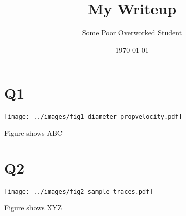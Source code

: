 \documentclass[12pt]{article}
\title{My Writeup}
\author{Some Poor Overworked Student}
\date{\today}
\begin{document}
\maketitle


\section{Q1}

\texttt{[image: ../images/fig1\_diameter\_propvelocity.pdf]}


Figure shows ABC


\section{Q2}
\texttt{[image: ../images/fig2\_sample\_traces.pdf]}

Figure shows XYZ
\end{document}
